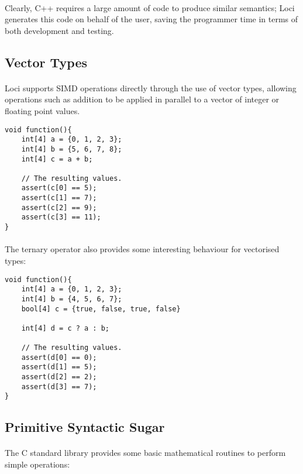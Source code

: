 \documentclass[12pt,twoside,notitlepage]{report}
\begin{document}
\paragraph{}
Clearly, C++ requires a large amount of code to produce similar semantics; Loci generates this code on behalf of the user, saving the programmer time in terms of both development and testing.

\subsection{Vector Types}

\paragraph{}
Loci supports SIMD operations directly through the use of vector types, allowing operations such as addition to be applied in parallel to a vector of integer or floating point values.

\small{
\begin{verbatim}
void function(){
    int[4] a = {0, 1, 2, 3};
    int[4] b = {5, 6, 7, 8};
    int[4] c = a + b;
    
    // The resulting values.
    assert(c[0] == 5);
    assert(c[1] == 7);
    assert(c[2] == 9);
    assert(c[3] == 11);
}
\end{verbatim}
}

\paragraph{}
The ternary operator also provides some interesting behaviour for vectorised types:

\small{
\begin{verbatim}
void function(){
    int[4] a = {0, 1, 2, 3};
    int[4] b = {4, 5, 6, 7};
    bool[4] c = {true, false, true, false}
    
    int[4] d = c ? a : b;
    
    // The resulting values.
    assert(d[0] == 0);
    assert(d[1] == 5);
    assert(d[2] == 2);
    assert(d[3] == 7);
}
\end{verbatim}
}

\subsection{Primitive Syntactic Sugar}

\paragraph{}
The C standard library provides some basic mathematical routines to perform simple operations:
\end{document}
